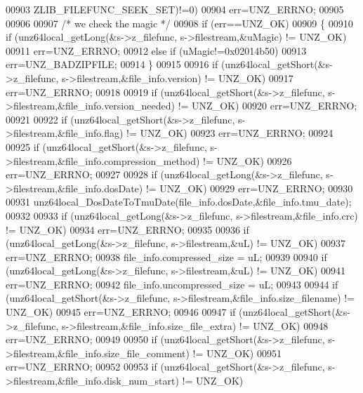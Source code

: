 \begin{DoxyCode}
00903               ZLIB\_FILEFUNC\_SEEK\_SET)!=0)
00904         err=UNZ\_ERRNO;
00905 
00906 
00907     \textcolor{comment}{/* we check the magic */}
00908     \textcolor{keywordflow}{if} (err==UNZ\_OK)
00909     \{
00910         \textcolor{keywordflow}{if} (unz64local\_getLong(&s->z\_filefunc, s->filestream,&uMagic) != UNZ\_OK)
00911             err=UNZ\_ERRNO;
00912         \textcolor{keywordflow}{else} \textcolor{keywordflow}{if} (uMagic!=0x02014b50)
00913             err=UNZ\_BADZIPFILE;
00914     \}
00915 
00916     \textcolor{keywordflow}{if} (unz64local\_getShort(&s->z\_filefunc, s->filestream,&file\_info.version) != UNZ\_OK)
00917         err=UNZ\_ERRNO;
00918 
00919     \textcolor{keywordflow}{if} (unz64local\_getShort(&s->z\_filefunc, s->filestream,&file\_info.version\_needed) != UNZ\_OK)
00920         err=UNZ\_ERRNO;
00921 
00922     \textcolor{keywordflow}{if} (unz64local\_getShort(&s->z\_filefunc, s->filestream,&file\_info.flag) != UNZ\_OK)
00923         err=UNZ\_ERRNO;
00924 
00925     \textcolor{keywordflow}{if} (unz64local\_getShort(&s->z\_filefunc, s->filestream,&file\_info.compression\_method) != UNZ\_OK)
00926         err=UNZ\_ERRNO;
00927 
00928     \textcolor{keywordflow}{if} (unz64local\_getLong(&s->z\_filefunc, s->filestream,&file\_info.dosDate) != UNZ\_OK)
00929         err=UNZ\_ERRNO;
00930 
00931     unz64local\_DosDateToTmuDate(file\_info.dosDate,&file\_info.tmu\_date);
00932 
00933     \textcolor{keywordflow}{if} (unz64local\_getLong(&s->z\_filefunc, s->filestream,&file\_info.crc) != UNZ\_OK)
00934         err=UNZ\_ERRNO;
00935 
00936     \textcolor{keywordflow}{if} (unz64local\_getLong(&s->z\_filefunc, s->filestream,&uL) != UNZ\_OK)
00937         err=UNZ\_ERRNO;
00938     file\_info.compressed\_size = uL;
00939 
00940     \textcolor{keywordflow}{if} (unz64local\_getLong(&s->z\_filefunc, s->filestream,&uL) != UNZ\_OK)
00941         err=UNZ\_ERRNO;
00942     file\_info.uncompressed\_size = uL;
00943 
00944     \textcolor{keywordflow}{if} (unz64local\_getShort(&s->z\_filefunc, s->filestream,&file\_info.size\_filename) != UNZ\_OK)
00945         err=UNZ\_ERRNO;
00946 
00947     \textcolor{keywordflow}{if} (unz64local\_getShort(&s->z\_filefunc, s->filestream,&file\_info.size\_file\_extra) != UNZ\_OK)
00948         err=UNZ\_ERRNO;
00949 
00950     \textcolor{keywordflow}{if} (unz64local\_getShort(&s->z\_filefunc, s->filestream,&file\_info.size\_file\_comment) != UNZ\_OK)
00951         err=UNZ\_ERRNO;
00952 
00953     \textcolor{keywordflow}{if} (unz64local\_getShort(&s->z\_filefunc, s->filestream,&file\_info.disk\_num\_start) != UNZ\_OK)

\end{DoxyCode}
